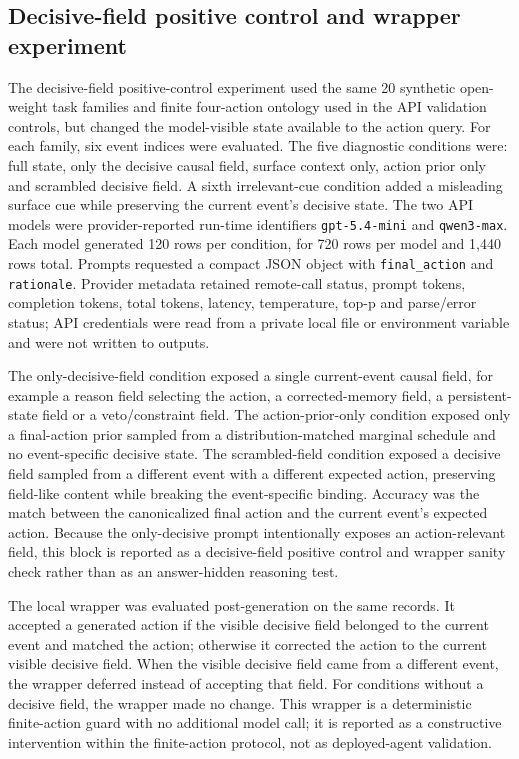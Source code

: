 ﻿\documentclass[preprint,12pt,authoryear]{elsarticle}
\begin{document}
\subsection{Decisive-field positive control and wrapper experiment}

The decisive-field positive-control experiment used the same 20 synthetic open-weight task families and finite four-action ontology used in the API validation controls, but changed the model-visible state available to the action query. For each family, six event indices were evaluated. The five diagnostic conditions were: full state, only the decisive causal field, surface context only, action prior only and scrambled decisive field. A sixth irrelevant-cue condition added a misleading surface cue while preserving the current event's decisive state. The two API models were provider-reported run-time identifiers \texttt{gpt-5.4-mini} and \texttt{qwen3-max}. Each model generated 120 rows per condition, for 720 rows per model and 1,440 rows total. Prompts requested a compact JSON object with \texttt{final\_action} and \texttt{rationale}. Provider metadata retained remote-call status, prompt tokens, completion tokens, total tokens, latency, temperature, top-p and parse/error status; API credentials were read from a private local file or environment variable and were not written to outputs.

The only-decisive-field condition exposed a single current-event causal field, for example a reason field selecting the action, a corrected-memory field, a persistent-state field or a veto/constraint field. The action-prior-only condition exposed only a final-action prior sampled from a distribution-matched marginal schedule and no event-specific decisive state. The scrambled-field condition exposed a decisive field sampled from a different event with a different expected action, preserving field-like content while breaking the event-specific binding. Accuracy was the match between the canonicalized final action and the current event's expected action. Because the only-decisive prompt intentionally exposes an action-relevant field, this block is reported as a decisive-field positive control and wrapper sanity check rather than as an answer-hidden reasoning test.

The local wrapper was evaluated post-generation on the same records. It accepted a generated action if the visible decisive field belonged to the current event and matched the action; otherwise it corrected the action to the current visible decisive field. When the visible decisive field came from a different event, the wrapper deferred instead of accepting that field. For conditions without a decisive field, the wrapper made no change. This wrapper is a deterministic finite-action guard with no additional model call; it is reported as a constructive intervention within the finite-action protocol, not as deployed-agent validation.
\end{document}
